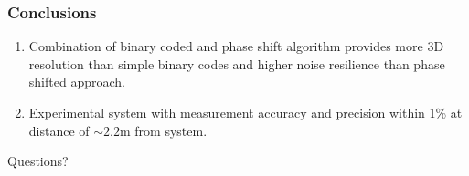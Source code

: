 \documentclass[9pt]{beamer}
\begin{document}
\begin{frame}
\frametitle{Conclusions}
\begin{enumerate}
\item Combination of binary coded and phase shift algorithm provides more 3D resolution than simple binary codes and higher noise resilience than phase shifted approach.     
\item Experimental system with measurement accuracy and precision within 1\% at distance of $\sim2.2$m from system.
 
\end{enumerate}
\end{frame}

\begin{frame}
Questions?
\end{frame}
\end{document}
